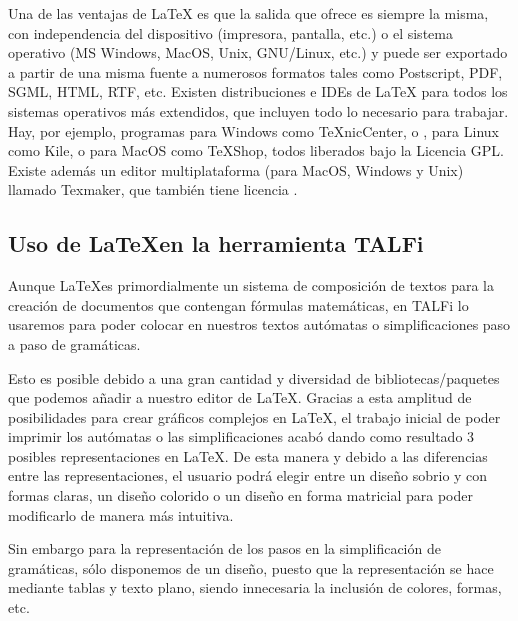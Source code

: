 \documentclass[12pt,a4paper,spanish]{book}
\begin{document}
Una de las ventajas de \LaTeX{} es que la salida que ofrece es siempre la misma, con independencia del dispositivo (impresora, pantalla, etc.) o el sistema operativo (MS Windows, MacOS, Unix, GNU/Linux, etc.) y puede ser exportado a partir de una misma fuente a numerosos formatos tales como Postscript, PDF, SGML, HTML, RTF, etc. Existen distribuciones e IDEs de LaTeX para todos los sistemas operativos m\'as extendidos, que incluyen todo lo necesario para trabajar. Hay, por ejemplo, programas para Windows como TeXnicCenter,  o , para Linux como Kile, o para MacOS como TeXShop, todos liberados bajo la Licencia GPL. Existe adem\'as un editor multiplataforma (para MacOS, Windows y Unix) llamado Texmaker, que tambi\'en tiene licencia .

\subsection{Uso de \LaTeX en la herramienta TALFi\\}
Aunque \LaTeX es primordialmente un sistema de composici\'on de textos para la creaci\'on de documentos que contengan f\'ormulas matem\'aticas, en TALFi lo usaremos para poder colocar en nuestros textos aut\'omatas o simplificaciones paso a paso de gram\'aticas. 

Esto es posible debido a una gran cantidad y diversidad de bibliotecas/paquetes que podemos a\~nadir a nuestro editor de \LaTeX{}.
Gracias a esta amplitud de posibilidades para crear gr\'aficos complejos en \LaTeX{}, el trabajo inicial de poder imprimir los aut\'omatas o las simplificaciones acab\'o dando como resultado 3 posibles representaciones en \LaTeX{}. De esta manera y debido a las diferencias entre las representaciones, el usuario podr\'a elegir entre un dise\~no sobrio y con formas claras, un dise\~no colorido o un dise\~no en forma matricial para poder modificarlo de manera m\'as intuitiva.

Sin embargo para la representaci\'on de los pasos en la simplificaci\'on de gram\'aticas, s\'olo disponemos de un dise\~no, puesto que la representaci\'on se hace mediante tablas y texto plano, siendo innecesaria la inclusi\'on de colores, formas, etc.
\end{document}

